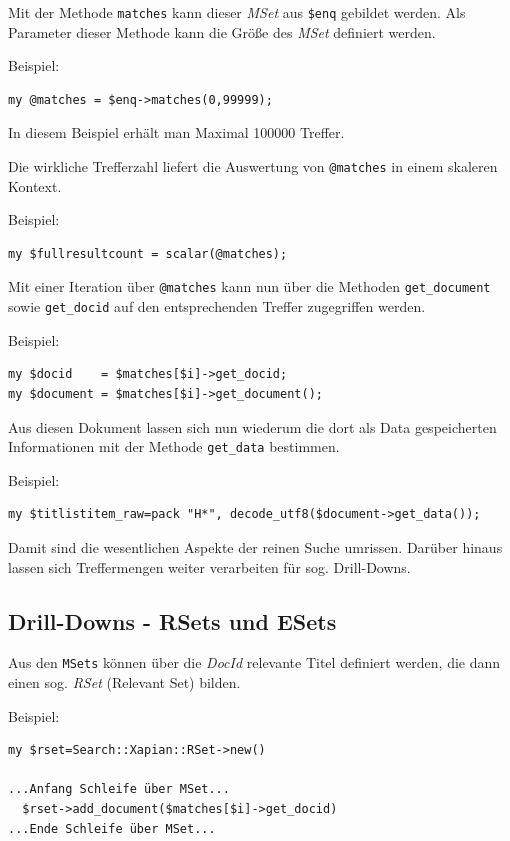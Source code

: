\documentclass[11pt, twoside, a4paper, BCOR8mm, DIV12, bibtotoc,idxtotoc]{scrbook}
\begin{document}
Mit der Methode \texttt{matches} kann dieser \emph{MSet} aus
\texttt{\$enq} gebildet werden. Als Parameter dieser Methode kann die Größe des
\emph{MSet} definiert werden.

Beispiel:
\begin{verbatim}
my @matches = $enq->matches(0,99999);
\end{verbatim}

In diesem Beispiel erhält man Maximal 100000 Treffer.

Die wirkliche Trefferzahl liefert die Auswertung von \texttt{@matches}
in einem skaleren Kontext.

Beispiel:
\begin{verbatim}
my $fullresultcount = scalar(@matches);
\end{verbatim}


Mit einer Iteration über \texttt{@matches} kann nun über die Methoden
\texttt{get\_document} sowie \texttt{get\_docid} auf den
entsprechenden Treffer zugegriffen werden.

Beispiel:
\begin{verbatim}
my $docid    = $matches[$i]->get_docid;
my $document = $matches[$i]->get_document();
\end{verbatim}

Aus diesen Dokument lassen sich nun wiederum die dort als Data
gespeicherten Informationen mit der Methode \texttt{get\_data} bestimmen.

Beispiel:
\begin{verbatim}
my $titlistitem_raw=pack "H*", decode_utf8($document->get_data());
\end{verbatim}

Damit sind die wesentlichen Aspekte der reinen Suche
umrissen. Darüber hinaus lassen sich Treffermengen weiter verarbeiten
für sog. Drill-Downs.


\subsection{Drill-Downs - RSets und ESets}

Aus den \texttt{MSets} können über die \emph{DocId} relevante Titel
definiert werden, die dann einen sog. \emph{RSet} (Relevant Set)
bilden.

Beispiel:
\begin{verbatim}
my $rset=Search::Xapian::RSet->new()

...Anfang Schleife über MSet...
  $rset->add_document($matches[$i]->get_docid)
...Ende Schleife über MSet...
\end{verbatim}
\end{document}

